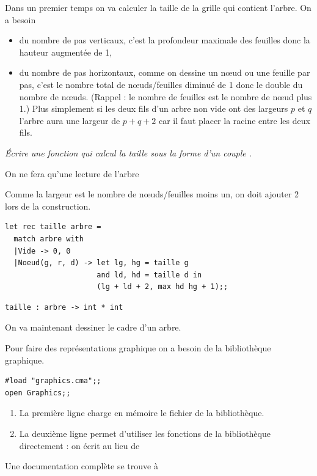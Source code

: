 Dans un premier temps on va calculer la taille de la grille qui contient l'arbre. On a besoin
\begin{itemize}
  \item du nombre de pas verticaux, c'est la profondeur maximale des feuilles donc la hauteur augmentée de 1,
  \item du nombre de pas horizontaux, comme on dessine un nœud ou une feuille par pas, c'est le nombre total de nœuds/feuilles diminué de 1 donc le double du nombre de nœuds. (Rappel : le nombre de feuilles est le nombre de nœud plus 1.) Plus simplement si les deux fils d'un arbre non vide ont des largeurs $p$ et $q$ l'arbre aura une largeur de $p + q + 2$ car il faut placer la racine entre les deux fils.
\end{itemize}
\begin{Exercise}\it 
Écrire une fonction qui calcul la taille sous la forme d'un couple .

On ne fera qu'une lecture de l'arbre

\end{Exercise}
\begin{Answer}
Comme la largeur est le nombre de nœuds/feuilles moins un, on doit ajouter 2 lors de la construction.
\begin{lstlisting}
let rec taille arbre =
  match arbre with
  |Vide -> 0, 0
  |Noeud(g, r, d) -> let lg, hg = taille g 
                     and ld, hd = taille d in
                     (lg + ld + 2, max hd hg + 1);;
\end{lstlisting}
\end{Answer}
\begin{lstlisting}
taille : arbre -> int * int
\end{lstlisting}
\newpage
On va maintenant dessiner le cadre d'un arbre.

Pour faire des représentations graphique on a besoin de la bibliothèque graphique.
\begin{lstlisting}
#load "graphics.cma";;
open Graphics;;
\end{lstlisting}
\begin{enumerate}
  \item La première ligne charge en mémoire le fichier de la bibliothèque.
  \item La deuxième ligne permet d'utiliser les fonctions de la bibliothèque directement : on écrit  au lieu de 
\end{enumerate}
Une documentation complète se trouve à

